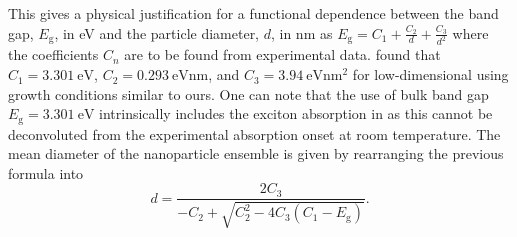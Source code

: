 \documentclass[9pt,twoside,twocolumn]{article}\usepackage{knitr}
\begin{document}
\begin{refsection}
This gives a physical justification for a functional dependence between the band gap, $E_\text{g}$, in \unit{\eV} and the particle diameter, $d$, in \unit{\nm} as $E_\text{g} = C_1 + \frac{C_2}{d} + \frac{C_3}{d^2}$ where the coefficients $C_n$ are to be found from experimental data. 
\textcite{Jacobsson2011} found that $C_1=\qty{3.301}{\eV}$, $C_2=\qty{0.293}{\eV\nm}$, and $C_3=\qty{3.94}{\eV\nm\squared}$ for low-dimensional  using growth conditions similar to ours.
One can note that the use of bulk band gap $E_\text{g}=\qty{3.301}{\eV}$ intrinsically includes the exciton absorption in  as this cannot be deconvoluted from the experimental absorption onset at room temperature. 
The mean diameter of the  nanoparticle ensemble is given by rearranging the previous formula into
\begin{equation}\label{eq:diameter}
d = \frac{2C_3}{-C_2 + \sqrt{C_2^2 - 4 C_3 (C_1 - E_\text{g})}}\text{.}
\end{equation}



\end{refsection}
\end{document}
